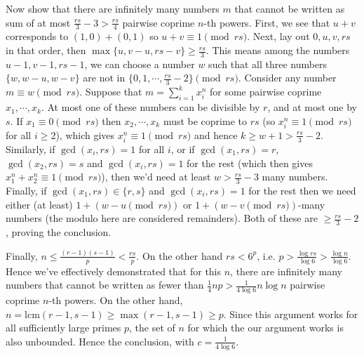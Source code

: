 \documentclass[11pt,a4paper]{article}
\begin{document}
\begin{enumerate}
	Now show that there are infinitely many numbers $m$ that cannot be written as sum of at most $\frac{rs}{3} - 3 > \frac{rs}{4}$ pairwise coprime $n$-th powers. 
	First, we see that $u + v$ corresponds to $(1, 0) + (0, 1)$ so $u + v\equiv 1\pmod{rs}$. 
	Next, lay out $0, u, v, rs$ in that order, then $\max\{u, v - u, rs - v\}\ge \frac{rs}{3}$. 
	This means among the numbers $u - 1, v - 1, rs - 1$, we can choose a number $w$ such that all three numbers 
	$\{w, w - u, w - v\}$ are not in $\{0, 1, \cdots, \frac{rs}{3} - 2\}\pmod{rs}$. 
	Consider any number $m\equiv w\pmod{rs}$. 
	Suppose that $m = \sum_{i=1}^k x_i^n$ for some pairwise coprime $x_1, \cdots, x_k$. 
	At most one of these numbers can be divisible by $r$, 
	and at most one by $s$. 
	If $x_1\equiv 0\pmod{rs}$ then $x_2, \cdots, x_k$ must be coprime to $rs$ (so $x_i^n\equiv 1\pmod{rs}$ for all $i\ge 2$), 
	which gives $x_i^n\equiv 1\pmod{rs}$ 
	and hence $k\ge w + 1 > \frac{rs}{3} - 2$. 
	Similarly, if $\gcd(x_i, rs)=1$ for all $i$, 
	or if $\gcd(x_1, rs)=r$, $\gcd(x_2, rs)=s$ and $\gcd(x_i, rs) = 1$ for the rest (which then gives $x_1^n+x_2^n\equiv 1\pmod{rs}$), 
	then we'd need at least $w > \frac{rs}{3} - 3$ many numbers. 
	Finally, if $\gcd(x_1, rs)\in\{r, s\}$ and $\gcd(x_i, rs) = 1$ for the rest then 
	we need either (at least) $1 + (w - u \pmod{rs})$ or $1 + (w - v \pmod{rs})$-many numbers 
	(the modulo here are considered remainders). 
	Both of these are $\ge \frac{rs}{3} - 2$, proving the conclusion. 
	
	Finally, $n \le \frac{(r-1)(s-1)}{p} < \frac{rs}{p}$. On the other hand $rs < 6^p$, i.e. 
	$p > \frac{\log rs}{\log 6} > \frac{\log n}{\log 6}$. 
	Hence we've effectively demonstrated that for this $n$, 
	there are infinitely many numbers that cannot be written as fewer than $\frac 14 np > \frac {1}{4\log 6}n\log n$ pairwise coprime $n$-th powers. 
	On the other hand, $n=\text{lcm}(r-1, s-1)\ge \max(r-1, s-1)\ge p$. 
	Since this argument works for all sufficiently large primes $p$, 
	the set of $n$ for which the our argument works is also unbounded. 
	Hence the conclusion, with $c = \frac {1}{4\log 6}$. 
	
\end{enumerate}
\end{document}
